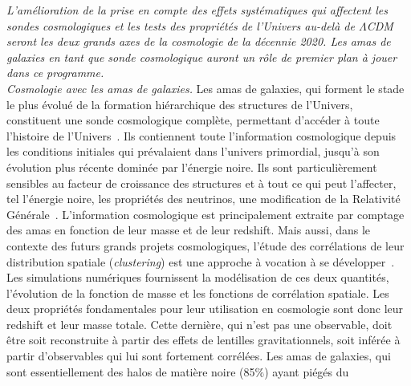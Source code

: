 \emph{L'amélioration de la prise en compte des effets systématiques
qui affectent les sondes cosmologiques et les tests des propriétés de
l'Univers au-delà de $\Lambda$CDM seront les deux grands axes de la
cosmologie de la décennie 2020. Les amas de galaxies en tant que sonde
cosmologique auront un rôle de premier plan à jouer dans ce programme.}\\


\emph{Cosmologie avec les amas de galaxies.}
Les amas de galaxies, qui forment le stade le plus évolué
de la formation hiérarchique des structures de l’Univers, constituent
une sonde cosmologique complète, permettant d’accéder à toute l’histoire de
l’Univers~\citep{Allen2011}. Ils contiennent toute l’information
cosmologique depuis les conditions initiales qui prévalaient dans
l’univers primordial, jusqu'à son évolution plus récente dominée par
l’énergie noire. Ils sont particulièrement sensibles au facteur de
croissance des structures et à tout ce qui peut l’affecter, tel l'énergie
noire, les propriétés des neutrinos, une modification de la Relativité
Générale~\citep{Haiman2001, Wang2005, Bolliet2019, Mohr2003,
Hagstotz2019}.
L’information cosmologique est principalement extraite par comptage
des amas en fonction de leur masse et de leur redshift. Mais aussi,
dans le contexte des futurs grands projets cosmologiques, l’étude des
corrélations de leur distribution spatiale (\emph{clustering}) est une
approche à vocation à se développer~\citep[e.g.][]{Mana2013}. Les
simulations numériques fournissent la modélisation de ces deux
quantités, l'évolution de la fonction de masse et les fonctions de
corrélation spatiale. Les deux propriétés fondamentales pour leur
utilisation en cosmologie sont donc leur redshift et leur masse
totale. Cette dernière, qui
n'est pas une observable, doit être soit reconstruite à partir des
effets de lentilles gravitationnels, soit inférée à partir
d'observables qui lui sont fortement corrélées. Les amas de galaxies,
qui sont essentiellement des halos de matière noire (85$\%$) ayant piégés du
